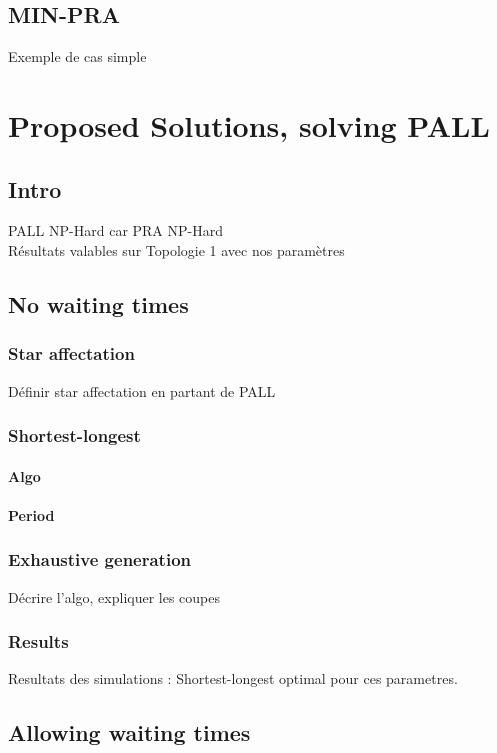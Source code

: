 \documentclass[a4paper,10pt]{article}
\begin{document}
   
  \subsection{MIN-PRA}
    Exemple de cas simple
    
\section{Proposed Solutions, solving PALL}

  \subsection{Intro}
    PALL NP-Hard car PRA NP-Hard\\
    Résultats valables sur Topologie 1 avec nos paramètres
    
  \subsection{No waiting times}
    \subsubsection{Star affectation}
      Définir star affectation en partant de PALL
    \subsubsection{Shortest-longest}
      \paragraph{Algo}
      \paragraph{Period}
    \subsubsection{Exhaustive generation}
      Décrire l'algo, expliquer les coupes
    \subsubsection{Results}
      Resultats des simulations : Shortest-longest optimal pour ces parametres.
      
   \subsection{Allowing waiting times}
\end{document}
